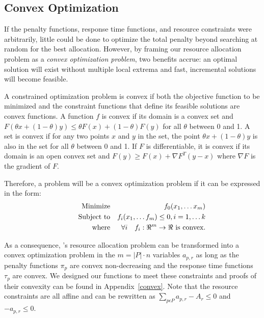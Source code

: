 \subsection*{Convex Optimization}

If the penalty functions, response time functions, and resource constraints were arbitrarily,
little could be done to optimize the total penalty beyond searching at random for the best allocation.
However, by framing our resource allocation problem as a \emph{convex optimization problem}\cite{BoVa},
two benefits accrue: an optimal solution will exist without multiple local extrema and
fast, incremental solutions will become feasible.

A constrained optimization problem is convex if both the objective function to be minimized
and the constraint functions that define its feasible solutions are convex functions.
A function $f$ is convex if its domain is a convex set and
$F(\theta x + (1-\theta)y) \leq \theta F(x) + (1-\theta)F(y)$
for all $\theta$ between 0 and 1.
A set is convex if for any two points $x$ and $y$ in the set, the point
$\theta x + (1-\theta)y$
is also in the set for all $\theta$ between 0 and 1.
If $F$ is differentiable, it is convex if its domain is an open convex set and
$F(y) \geq F(x) + \nabla F^T(y-x)$ where $\nabla F$ is the gradient of $F$.

Therefore, a problem will be a convex optimization problem if it can be expressed in the form:
\begin{eqnarray*}
& \makebox[1in][r]{Minimize}   & f_0(x_1,\ldots x_m)                              \\
& \makebox[1in][r]{Subject to} & f_i(x_1,\ldots f_m) \leq 0, i = 1,\ldots k        \\
& \makebox[1in][r]{where}      & \forall i \quad f_i:\Re^m \rightarrow \Re \mbox{ is convex.}
\end{eqnarray*}


As a consequence, \pacora's resource allocation problem can be transformed into a convex optimization problem in the $m = |P|\cdot n$ variables $a_{p,r}$ as long as the penalty functions $\pi_p$ are convex non-decreasing and the response time functions $\tau_p$ are convex.  We designed our functions to meet these constraints and proofs of their convexity can be found in Appendix~\ref{convex}. Note that the resource constraints are all affine and can be rewritten as
$\sum_{p\epsilon P} a_{p,r} - A_r \leq 0$ and $-a_{p,r} \leq 0$.

